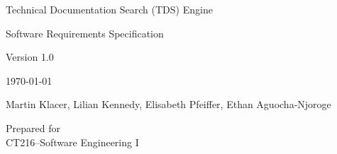 \documentclass[12pt, a4paper]{article}
\newcommand{\projectname}{Technical Documentation Search (TDS) Engine}
\begin{document}
\begin{titlepage}
    \centering
    \vspace*{4cm}
    {\Large \projectname \par}
    \vspace{2cm}
    {\Large Software Requirements Specification \par}
    \vspace{0.5cm}
    {\Large Version 1.0 \par}
    \vspace{0.5cm}
    {\Large \today \par}
    \vspace{2cm}
    {\Large Martin Klacer, Lilian Kennedy, Elisabeth Pfeiffer, Ethan Aguocha-Njoroge \par}
    \vfill

    Prepared for\\
    CT216--Software Engineering I\par

\end{titlepage}

\tableofcontents
\newpage







\end{document}
